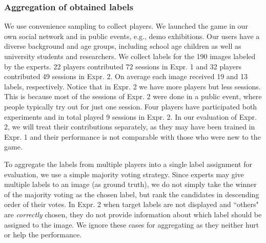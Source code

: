 \noindent
\subsubsection{Aggregation of obtained labels}
We use convenience sampling to collect players. %
We launched the game in our own social network and in public events, e.g., demo exhibitions. 
Our users have a diverse background and age groups, including school age children
as well as university students and researchers. 
%
We collect labels for the 190 images labeled by the experts.  %
22 players contributed 72 sessions in Expr. 1 and 32 players contributed 49 sessions in Expr. 2. 
On average each image received 19 and 13 labels, respectively.
%
%
Notice that in Expr. 2 we have more players but less sessions. This is because most
of the sessions of Expr. 2 were done in a public event, where people typically 
try out for just one session.  
%
Four players have participated both experiments and in total played 9 sessions in Expr. 2. 
In our evaluation of Expr. 2, we will treat their contributions separately, as they may have been 
trained in Expr. 1 and their performance is not comparable with those who were new to the game.

%
%
%
To aggregate the labels from multiple players into a single label assignment for evaluation, we use
a simple majority voting strategy.
Since experts may give multiple labels to an image (as ground truth), 
we do not simply take the winner of the majority voting as the chosen label, but rank
the candidates in descending order of their votes.
%
In Expr. 2 when target labels are not displayed and ``others" are \emph{correctly} chosen,
they do not provide information about which label should be assigned to the image.
We ignore these cases for aggregating as they neither hurt or help the performance. 


